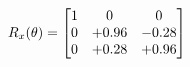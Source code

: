 \documentclass[preview]{standalone}
\begin{document}
\begin{align*}
\special{dvisvgm:raw <g id='unique000'>}R_{x}(\theta) = \begin{bmatrix}1 & 0 & 0 \\0 & +0.96 & -0.28 \\0 & +0.28 & +0.96\end{bmatrix}\special{dvisvgm:raw </g>}
\end{align*}
\end{document}
